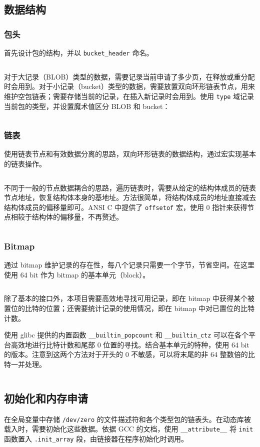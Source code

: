 \documentclass[12pt, a4paper]{article}
\newcommand{\LabSrc}[1]{\inputminted[fontsize=\scriptsize, breaklines]{c}{./src/#1.c}}
\begin{document}
\subsection{数据结构}

\subsubsection{包头}
首先设计包的结构，并以 \texttt{bucket\_header} 命名。

\LabSrc{bag}

对于大记录（BLOB）类型的数据，需要记录当前申请了多少页，在释放或重分配时会用到。对于小记录（bucket）类型的数据，需要放置双向环形链表节点，用来维护空包链表；需要存储当前的记录，在插入新记录时会用到。使用 \texttt{type} 域记录当前包的类型，并设置魔术值区分 BLOB 和 bucket：

\LabSrc{bag_def}

\subsubsection{链表}
使用链表节点和有效数据分离的思路，双向环形链表的数据结构，通过宏实现基本的链表操作。

\LabSrc{list}

不同于一般的节点数据耦合的思路，遍历链表时，需要从给定的结构体成员的链表节点地址，恢复结构体本身的基地址。方法很简单，将结构体成员的地址直接减去结构体成员的偏移量即可。ANSI C 中提供了 \texttt{offsetof} 宏，使用 0 指针来获得节点相较于结构体的偏移量，不再赘述。

\LabSrc{list_em}

\subsubsection{Bitmap}
通过 bitmap 维护记录的存在性，每八个记录只需要一个字节，节省空间。在这里使用 64 bit 作为 bitmap 的基本单元（block）。

\LabSrc{bitmap}

除了基本的接口外，本项目需要高效地寻找可用记录，即在 bitmap 中获得某个被置位的比特的位置；还需要统计记录的使用情况，即在 bitmap 中对已置位的比特计数。

使用 glibc 提供的内置函数 \texttt{\_\_builtin\_popcount} 和 \texttt{\_\_builtin\_ctz} 可以在各个平台高效地进行比特计数和尾部 0 位置的寻找。结合基本单元的特种，使用 64 bit 的版本。注意到这两个方法对于开头的 0 不敏感，可以将末尾的非 64 整数倍的比特一并处理。

\LabSrc{bitmap_em}

\subsection{初始化和内存申请}
在全局变量中存储 \texttt{/dev/zero} 的文件描述符和各个类型包的链表头。在动态库被载入时，需要初始化这些数据。依据 GCC 的文档，使用 \texttt{\_\_attribute\_\_} 将 \texttt{init} 函数置入 \texttt{.init\_array} 段，由链接器在程序初始化时调用。
\end{document}
